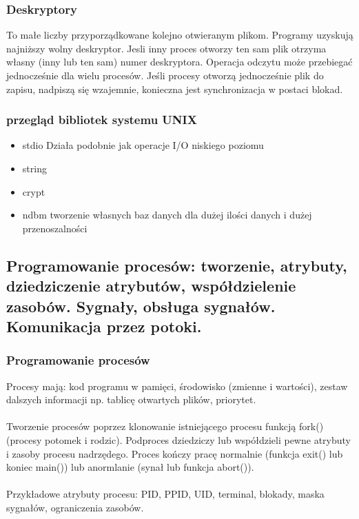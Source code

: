 \documentclass[a4paper,twoside]{report}
\begin{document}
\subsubsection{Deskryptory}

To małe liczby przyporządkowane kolejno otwieranym plikom. Programy uzyskują najniższy wolny deskryptor. Jesli inny proces otworzy ten sam plik otrzyma własny (inny lub ten sam) numer deskryptora. Operacja odczytu może przebiegać jednocześnie dla wielu procesów. Jeśli procesy otworzą jednocześnie plik do zapisu, nadpiszą się wzajemnie, konieczna jest synchronizacja w postaci blokad. 

\subsubsection{przegląd bibliotek systemu UNIX}

\begin{itemize}
	\item stdio 
	Działa podobnie jak operacje I/O niskiego poziomu
	\item string 
	\item crypt 
	\item ndbm
	tworzenie własnych baz danych dla dużej ilości danych i dużej przenoszalności 
\end{itemize}

\subsection{ Programowanie procesów: tworzenie, atrybuty, dziedziczenie atrybutów, współdzielenie zasobów. Sygnały, obsługa sygnałów. Komunikacja przez potoki. }

\subsubsection{Programowanie procesów}
Procesy mają: kod programu w pamięci, środowisko (zmienne i wartości), zestaw dalszych informacji np. tablicę otwartych plików, priorytet. \\
\\
Tworzenie procesów poprzez klonowanie istniejącego procesu funkcją fork() (procesy potomek i rodzic). Podproces dziedziczy lub współdzieli pewne atrybuty i zasoby procesu nadrzędego. Proces kończy pracę normalnie (funkcja exit() lub koniec main()) lub anormlanie (synał lub funkcja abort()).\\ 
\\
Przykładowe atrybuty procesu:  PID, PPID, UID, terminal, blokady, maska sygnałów, ograniczenia zasobów.
\end{document}

